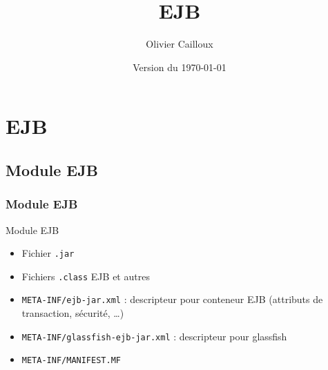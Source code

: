 \documentclass[english, french]{beamer}
\title{EJB}
\author{Olivier Cailloux}
\institute[LAMSADE]{LAMSADE, Université Paris-Dauphine}
\date{Version du \today}
\begin{document}


\begin{frame}[plain]
   \titlepage
\end{frame}
\addtocounter{framenumber}{-1}

\section{EJB}
\subsection{Module EJB}
\begin{frame}
	\frametitle{Module EJB}
	\begin{block}{Module EJB}
		\begin{itemize}
			\item Fichier \texttt{.jar}
			\item Fichiers \texttt{.class} EJB et autres
			\item \texttt{META-INF/ejb-jar.xml} : descripteur pour conteneur EJB (attributs de transaction, sécurité, …)
			\item \texttt{META-INF/glassfish-ejb-jar.xml} : descripteur pour glassfish
			\item \texttt{META-INF/MANIFEST.MF}
		\end{itemize}
	\end{block}
\end{frame}
\end{document}
